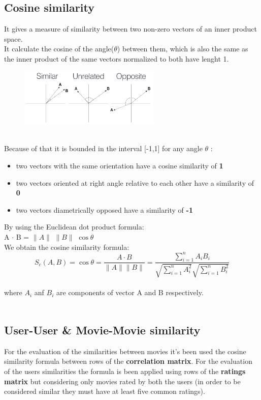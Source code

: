 \documentclass{article}
\begin{document}
\subsection{Cosine similarity}
It gives a measure of similarity between two non-zero vectors of an inner product space.\\It calculate the cosine of the angle($\theta$) between them, which is also the same as the inner product of the same vectors normalized to both have lenght 1. \\
\begin{figure}[ht]
      \begin{center}
            \includegraphics[width=0.6\textwidth]{images/cosine.png}
      \end{center}
\end{figure}\\
Because of that it is bounded in the interval [-1,1] for any angle $\theta$ :
\begin{itemize}
      \item two vectors with the same orientation have a cosine similarity of \textbf{1}
      \item two vectors oriented at right angle relative to each other have a similarity of \textbf{0}
      \item two vectors diametrically opposed have a similarity of \textbf{-1}
\end{itemize}
By using the Euclidean dot product formula:\\
A $\cdot$ B = $\|A\|$ $\|B\|$ $\cos\theta$ \\
We obtain the cosine similarity formula:\\
\begin{equation}
      S_c(A,B) = \cos\theta = \frac{A \cdot B}{\|A\| \|B\|} = \frac{\sum_{i=1}^n A_i B_i}{\sqrt{\sum_{i=1}^n A_i^2}\sqrt{\sum_{i=1}^n B_i^2}}
\end{equation}\\
where $A_i$ anf $B_i$ are components of vector A and B respectively.\\ \\


\subsection{User-User \& Movie-Movie similarity}
For the evaluation of the similarities between movies it's been used the cosine similarity formula between rows of the \textbf{correlation matrix}. For the evaluation of the users similarities the formula is been applied using rows of the \textbf{ratings matrix} but considering only movies rated by both the users (in order to be considered similar they must have at least five common ratings).\\
\end{document}
